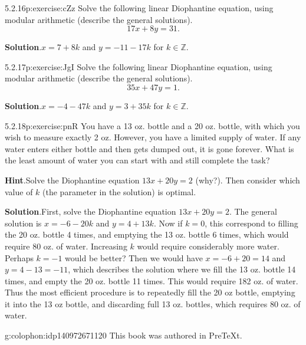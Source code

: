 \documentclass[twoside,11pt,]{book}
\newcommand{\blocktitlefont}{\relax}
\numberwithin{equation}{chapter}
\newcommand{\Z}{\mathbb Z}
\begin{document}
\begin{divisionsolution}{5.2.16}{}{p:exercise:cZz}%
Solve the following linear Diophantine equation, using modular arithmetic (describe the general solutions).%
\begin{equation*}
17x + 8y = 31\text{.}
\end{equation*}
%
\par\smallskip%
\noindent\textbf{\blocktitlefont Solution}.\quad{}\(x = 7+8k\) and \(y = -11 - 17k\) for \(k \in \Z\).%
\end{divisionsolution}%
\begin{divisionsolution}{5.2.17}{}{p:exercise:JgI}%
Solve the following linear Diophantine equation, using modular arithmetic (describe the general solutions).%
\begin{equation*}
35x + 47y = 1\text{.}
\end{equation*}
%
\par\smallskip%
\noindent\textbf{\blocktitlefont Solution}.\quad{}\(x = -4-47k\) and \(y = 3 + 35k\) for \(k \in \Z\).%
\end{divisionsolution}%
\begin{divisionsolution}{5.2.18}{}{p:exercise:pnR}%
You have a 13 oz. bottle and a 20 oz. bottle, with which you wish to measure exactly 2 oz. However, you have a limited supply of water. If any water enters either bottle and then gets dumped out, it is gone forever. What is the least amount of water you can start with and still complete the task?%
\par\smallskip%
\noindent\textbf{\blocktitlefont Hint}.\quad{}Solve the Diophantine equation \(13x + 20 y = 2\) (why?).  Then consider which value of \(k\) (the parameter in the solution) is optimal.%
\par\smallskip%
\noindent\textbf{\blocktitlefont Solution}.\quad{}First, solve the Diophantine equation \(13x + 20 y = 2\). The general solution is \(x = -6 - 20k\) and \(y = 4+13k\). Now if \(k = 0\), this correspond to filling the 20 oz. bottle 4 times, and emptying the 13 oz. bottle 6 times, which would require 80 oz. of water. Increasing \(k\) would require considerably more water. Perhaps \(k = -1\) would be better? Then we would have \(x = -6+20 = 14\) and \(y = 4-13 = -11\), which describes the solution where we fill the 13 oz. bottle 14 times, and empty the 20 oz. bottle 11 times. This would require 182 oz. of water. Thus the most efficient procedure is to repeatedly fill the 20 oz bottle, emptying it into the 13 oz bottle, and discarding full 13 oz. bottles, which requires 80 oz. of water.%
\end{divisionsolution}%
%
\backmatter
%
%
%
\cleardoublepage
\pagestyle{empty}
\begin{backcolophon}{g:colophon:idp140972671120}%
This book was authored in PreTeXt.%
\end{backcolophon}%
\end{document}
